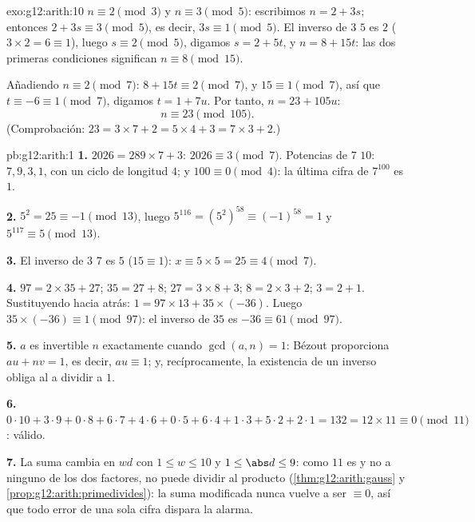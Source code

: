 \begin{solution}{exo:g12:arith:10}
$n \equiv 2 \pmod 3$ y $n \equiv 3 \pmod 5$: escribimos $n = 2 + 3s$;
entonces $2 + 3s \equiv 3 \pmod 5$, es decir, $3s \equiv 1 \pmod 5$. El
inverso de $3$  $5$ es $2$ ($3\times2 = 6 \equiv 1$), luego
$s \equiv 2 \pmod 5$, digamos $s = 2 + 5t$, y $n = 8 + 15t$: las dos
primeras condiciones significan $n \equiv 8 \pmod{15}$.

Añadiendo $n \equiv 2 \pmod 7$: $8 + 15t \equiv 2 \pmod 7$, y
$15 \equiv 1 \pmod 7$, así que $t \equiv -6 \equiv 1 \pmod 7$, digamos
$t = 1 + 7u$. Por tanto, $n = 23 + 105u$:
\[
n \equiv 23 \pmod{105}.
\]
(Comprobación: $23 = 3\times7 + 2 = 5\times4 + 3 = 7\times3 + 2$.)
\end{solution}

\begin{solution}{pb:g12:arith:1}
\textbf{1.} $2026 = 289 \times 7 + 3$: $2026 \equiv 3 \pmod 7$. Potencias
de $7$  $10$: $7, 9, 3, 1$, con un ciclo de longitud $4$; y
$100 \equiv 0 \pmod 4$: la última cifra de $7^{100}$ es $1$.

\textbf{2.} $5^2 = 25 \equiv -1 \pmod{13}$, luego
$5^{116} = \left(5^2\right)^{58} \equiv (-1)^{58} = 1$ y
$5^{117} \equiv 5 \pmod{13}$.

\textbf{3.} El inverso de $3$  $7$ es $5$ ($15 \equiv 1$):
$x \equiv 5 \times 5 = 25 \equiv 4 \pmod 7$.

\textbf{4.} $97 = 2 \times 35 + 27$; $35 = 27 + 8$; $27 = 3 \times 8 + 3$;
$8 = 2 \times 3 + 2$; $3 = 2 + 1$. Sustituyendo hacia atrás:
$1 = 97 \times 13 + 35 \times (-36)$. Luego
$35 \times (-36) \equiv 1 \pmod{97}$: el inverso de $35$ es
$-36 \equiv 61 \pmod{97}$.

\textbf{5.} $a$ es invertible  $n$ exactamente cuando
$\gcd(a, n) = 1$: Bézout proporciona $au + nv = 1$, es decir,
$au \equiv 1$; y, recíprocamente, la existencia de un inverso obliga al
 a dividir a $1$.

\textbf{6.} $0{\cdot}10 + 3{\cdot}9 + 0{\cdot}8 + 6{\cdot}7 +
4{\cdot}6 + 0{\cdot}5 + 6{\cdot}4 + 1{\cdot}3 + 5{\cdot}2 +
2{\cdot}1 = 132 = 12 \times 11 \equiv 0 \pmod{11}$: válido.

\textbf{7.} La suma cambia en $wd$ con $1 \leq w \leq 10$ y
$1 \leq \abs d \leq 9$: como $11$ es  y no  a ninguno de los dos
factores, no puede dividir al producto
(\cref{thm:g12:arith:gauss} y \cref{prop:g12:arith:primedivides}): la suma
modificada nunca vuelve a ser $\equiv 0$, así que todo error de una sola
cifra dispara la alarma.


\end{solution}

